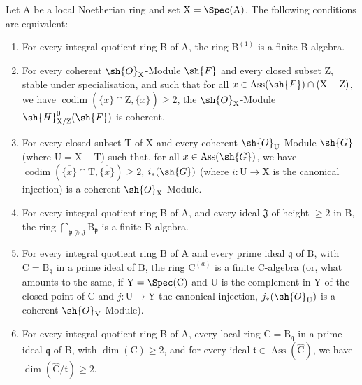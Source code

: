 \begin{proposition}[7.2.4]
\label{IV.7.2.4}
Let $\mathrm{A}$ be a local Noetherian ring and set $\mathrm{X}=\Spec(\mathrm{A})$.
The following conditions are equivalent:
\begin{enumerate}[label=\emph{\alph*)}]
  \item For every integral quotient ring $\mathrm{B}$ of $\mathrm{A}$, the ring $\mathrm{B}^{(1)}$ is a finite B-algebra.
  \item For every coherent $\sh{O}_\mathrm{X}$-Module $\sh{F}$ and every closed subset $\mathrm{Z}$, stable under specialisation, and such that for all $x\in\operatorname{Ass}(\sh{F})\cap(\mathrm{X}-\mathrm{Z})$, we have $\operatorname{codim}(\overline{\{x\}}\cap\mathrm{Z},\overline{\{x\}})\geqslant 2$, the $\sh{O}_\mathrm{X}$-Module $\sh{H}^0_{\mathrm{X}/\mathrm{Z}}(\sh{F})$ is coherent.
  \item For every closed subset $\mathrm{T}$ of $\mathrm{X}$ and every coherent $\sh{O}_\mathrm{U}$-Module $\sh{G}$ (where $\mathrm{U}=\mathrm{X}-\mathrm{T}$) such that, for all $x\in\operatorname{Ass}(\sh{G})$, we have $\operatorname{codim}(\overline{\{x\}}\cap\mathrm{T},\overline{\{x\}})\geqslant 2$, $i_*(\sh{G})$ (where $i:\mathrm{U}\to\mathrm{X}$ is the canonical injection) is a coherent $\sh{O}_\mathrm{X}$-Module.
  \item For every integral quotient ring $\mathrm{B}$ of $\mathrm{A}$, and every ideal $\mathfrak{J}$ of height $\geqslant 2$ in $\mathrm{B}$, the ring $\bigcap_{\mathfrak{p}\not\supset\mathfrak{J}}\mathrm{B}_\mathfrak{p}$ is a finite B-algebra.
  \item For every integral quotient ring $\mathrm{B}$ of $\mathrm{A}$ and every prime ideal $\mathfrak{q}$ of $\mathrm{B}$, with $\mathrm{C}=\mathrm{B}_\mathfrak{q}$ in a prime ideal of $\mathrm{B}$, the ring $\mathrm{C}^{(a)}$ is a finite C-algebra (or, what amounts to the same, if $\mathrm{Y}=\Spec(\mathrm{C})$ and $\mathrm{U}$ is the complement in $\mathrm{Y}$ of the closed point of $\mathrm{C}$ and $j:\mathrm{U}\to\mathrm{Y}$ the canonical injection, $j_*(\sh{O}_\mathrm{U})$ is a coherent $\sh{O}_\mathrm{Y}$-Module).
  \item For every integral quotient ring $\mathrm{B}$ of $\mathrm{A}$, every local ring $\mathrm{C}=\mathrm{B}_\mathfrak{q}$ in a prime ideal $\mathfrak{q}$ of $\mathrm{B}$, with $\dim(\mathrm{C})\geqslant 2$, and for every ideal $\mathfrak{t}\in\operatorname{Ass}(\widehat{\mathrm{C}})$, we have $\dim(\widehat{\mathrm{C}}/\mathfrak{t})\geqslant 2$.
\end{enumerate}
\end{proposition}

